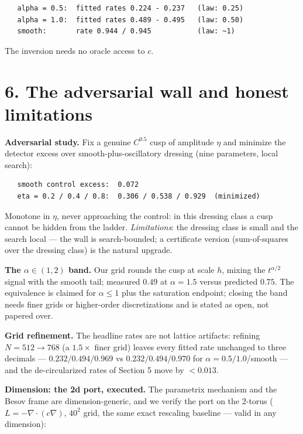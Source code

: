 \documentclass[11pt]{article}
\begin{document}
\begin{small}\begin{verbatim}
   alpha = 0.5:  fitted rates 0.224 - 0.237   (law: 0.25)
   alpha = 1.0:  fitted rates 0.489 - 0.495   (law: 0.50)
   smooth:       rate 0.944 / 0.945           (law: ~1)
\end{verbatim}\end{small}
The inversion needs no oracle access to $c$.

\section*{6. The adversarial wall and honest limitations}
\textbf{Adversarial study.}  Fix a genuine $C^{0.5}$ cusp of amplitude $\eta$ and minimize the detector excess over smooth-plus-oscillatory dressing (nine parameters, local search):

\begin{small}\begin{verbatim}
   smooth control excess:  0.072
   eta = 0.2 / 0.4 / 0.8:  0.306 / 0.538 / 0.929  (minimized)
\end{verbatim}\end{small}
Monotone in $\eta$, never approaching the control: in this dressing class a cusp cannot be hidden from the ladder.  \emph{Limitations}: the dressing class is small and the search local — the wall is search-bounded; a certificate version (sum-of-squares over the dressing class) is the natural upgrade.

\textbf{The $\alpha \in (1, 2)$ band.}  Our grid rounds the cusp at scale $h$, mixing the $t^{\alpha/2}$ signal with the smooth tail; measured $0.49$ at $\alpha = 1.5$ versus predicted $0.75$.  The equivalence is claimed for $\alpha \le 1$ plus the saturation endpoint; closing the band needs finer grids or higher-order discretizations and is stated as open, not papered over.

\textbf{Grid refinement.}  The headline rates are not lattice artifacts: refining $N = 512 \to 768$ (a $1.5\times$ finer grid) leaves every fitted rate unchanged to three decimals — $0.232/0.494/0.969$ vs $0.232/0.494/0.970$ for $\alpha = 0.5/1.0$/smooth — and the de-circularized rates of Section 5 move by $< 0.013$.

\textbf{Dimension: the 2d port, executed.}  The parametrix mechanism and the Besov frame are dimension-generic, and we verify the port on the 2-torus ($L = -\nabla\!\cdot(c\nabla)$, $40^2$ grid, the same exact rescaling baseline — valid in any dimension):
\end{document}
